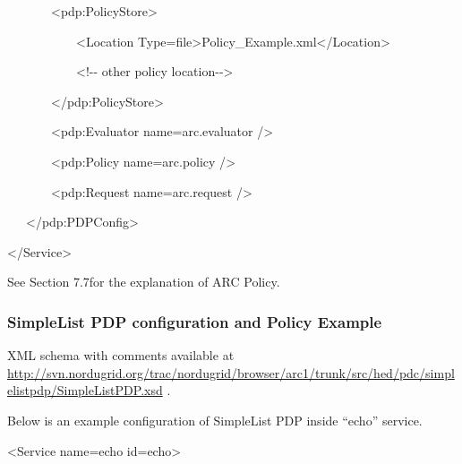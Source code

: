 \documentclass{article}
\newcommand\textstyleInternetlink[1]{\textcolor[rgb]{0.0,0.0,0.5019608}{#1}}
\begin{document}
{\ttfamily\color{black}
\ \ \ \ \ \ \ {\textless}pdp:PolicyStore{\textgreater}}

{\ttfamily\color{black}
\ \ \ \ \ \ \ \ \ \ \ {\textless}Location
Type={\textquotedbl}file{\textquotedbl}{\textgreater}Policy\_Example.xml{\textless}/Location{\textgreater}}

{\ttfamily\color{black}
\ \ \ \ \ \ \ \ \ \ \ {\textless}!-{}- other policy
location-{}-{\textgreater}}

{\ttfamily\color{black}
\ \ \ \ \ \ \ {\textless}/pdp:PolicyStore{\textgreater}}

{\ttfamily\color{black}
\ \ \ \ \ \ \ {\textless}pdp:Evaluator
name={\textquotedbl}arc.evaluator{\textquotedbl} /{\textgreater}}

{\ttfamily\color{black}
\ \ \ \ \ \ \ {\textless}pdp:Policy
name={\textquotedbl}arc.policy{\textquotedbl} /{\textgreater}}

{\ttfamily\color{black}
\ \ \ \ \ \ \ {\textless}pdp:Request
name={\textquotedbl}arc.request{\textquotedbl} /{\textgreater}}

{\ttfamily\color{black}
\ \ \ {\textless}/pdp:PDPConfig{\textgreater}}

{\ttfamily\color{black}
{\textless}/Service{\textgreater}}

{\upshape\color{black}
See Section 7.7for the explanation of ARC Policy.}

\subsubsection{SimpleList PDP configuration and Policy Example}
{\upshape\color{black}
XML schema with comments available at
\href{http://svn.nordugrid.org/trac/nordugrid/browser/arc1/trunk/src/hed/pdc/simplelistpdp/SimpleListPDP.xsd}{\textstyleInternetlink{http://svn.nordugrid.org/trac/nordugrid/browser/arc1/trunk/src/hed/pdc/simplelistpdp/SimpleListPDP.}}\href{http://svn.nordugrid.org/trac/nordugrid/browser/arc1/trunk/src/hed/pdc/simplelistpdp/SimpleListPDP.xsd}{\textstyleInternetlink{xsd}}
.}

{\upshape\color{black}
Below is an example configuration of SimpleList PDP inside
{\textquotedblleft}echo{\textquotedblright} service.}

{\ttfamily\color{black}
{\textless}Service name={\textquotedbl}echo{\textquotedbl}
id={\textquotedbl}echo{\textquotedbl}{\textgreater}}
\end{document}
